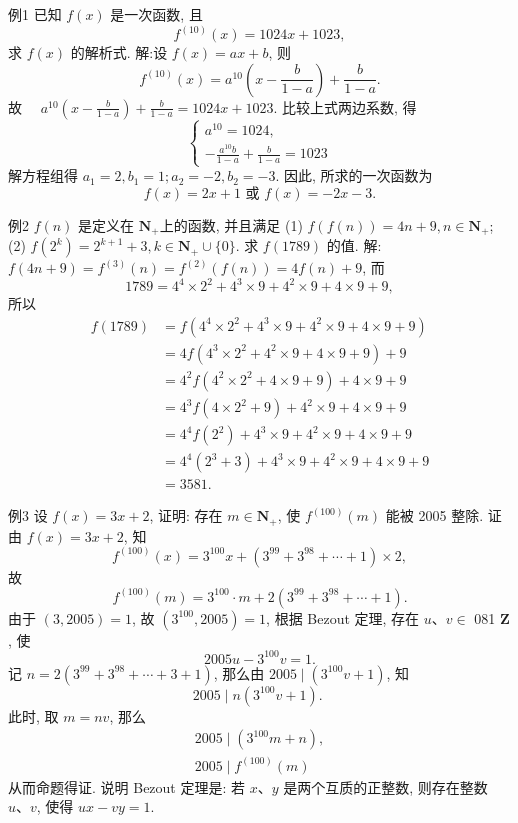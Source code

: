 例1 已知 $f(x)$ 是一次函数, 且
$$
f^{(10)}(x)=1024 x+1023,
$$
求 $f(x)$ 的解析式.
解:设 $f(x)=a x+b$, 则
$$
f^{(10)}(x)=a^{10}\left(x-\frac{b}{1-a}\right)+\frac{b}{1-a} .
$$
故 $\quad a^{10}\left(x-\frac{b}{1-a}\right)+\frac{b}{1-a}=1024 x+1023$.
比较上式两边系数, 得
$$
\left\{\begin{array}{l}
a^{10}=1024, \\
-\frac{a^{10} b}{1-a}+\frac{b}{1-a}=1023
\end{array}\right.
$$
解方程组得 $a_1=2, b_1=1 ; a_2=-2, b_2=-3$.
因此, 所求的一次函数为
$$
f(x)=2 x+1 \text { 或 } f(x)=-2 x-3 .
$$



例2 $f(n)$ 是定义在 $\mathbf{N}_{+}$上的函数, 并且满足
(1) $f(f(n))=4 n+9, n \in \mathbf{N}_{+}$;
(2) $f\left(2^k\right)=2^{k+1}+3, k \in \mathbf{N}_{+} \cup\{0\}$.
求 $f(1789)$ 的值.
解:$f(4 n+9)=f^{(3)}(n)=f^{(2)}(f(n))=4 f(n)+9$, 而
$$
1789=4^4 \times 2^2+4^3 \times 9+4^2 \times 9+4 \times 9+9,
$$
所以
$$
\begin{aligned}
f(1789) & =f\left(4^4 \times 2^2+4^3 \times 9+4^2 \times 9+4 \times 9+9\right) \\
& =4 f\left(4^3 \times 2^2+4^2 \times 9+4 \times 9+9\right)+9 \\
& =4^2 f\left(4^2 \times 2^2+4 \times 9+9\right)+4 \times 9+9 \\
& =4^3 f\left(4 \times 2^2+9\right)+4^2 \times 9+4 \times 9+9 \\
& =4^4 f\left(2^2\right)+4^3 \times 9+4^2 \times 9+4 \times 9+9 \\
& =4^4\left(2^3+3\right)+4^3 \times 9+4^2 \times 9+4 \times 9+9 \\
& =3581 .
\end{aligned}
$$



例3 设 $f(x)=3 x+2$, 证明: 存在 $m \in \mathbf{N}_{+}$, 使 $f^{(100)}(m)$ 能被 2005 整除.
证由 $f(x)=3 x+2$, 知
$$
f^{(100)}(x)=3^{100} x+\left(3^{99}+3^{98}+\cdots+1\right) \times 2,
$$
故
$$
f^{(100)}(m)=3^{100} \cdot m+2\left(3^{99}+3^{98}+\cdots+1\right) .
$$
由于 $(3,2005)=1$, 故 $\left(3^{100}, 2005\right)=1$, 根据 Bezout 定理, 存在 $u 、 v \in$
081
$\mathbf{Z}$, 使
$$
2005 u-3^{100} v=1 .
$$
记 $n=2\left(3^{99}+3^{98}+\cdots+3+1\right)$, 那么由 $2005 \mid\left(3^{100} v+1\right)$,
知
$$
2005 \mid n\left(3^{100} v+1\right) \text {. }
$$
此时, 取 $m=n v$, 那么
$$
\begin{gathered}
2005 \mid\left(3^{100} m+n\right), \\
2005 \mid f^{(100)}(m)
\end{gathered}
$$
从而命题得证.
说明 Bezout 定理是: 若 $x 、 y$ 是两个互质的正整数, 则存在整数 $u 、 v$, 使得 $u x-v y=1$.




